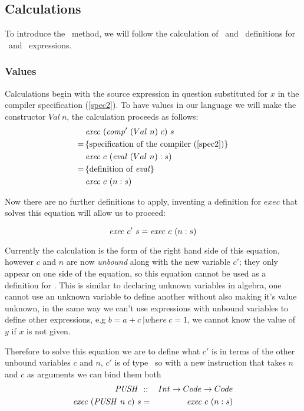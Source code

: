 \documentclass {article}
\begin{document}
\subsection{Calculations}

To introduce the \BH\ method,
we will follow the 
calculation of \comp\ and \exec\ definitions
for \val\ and \add\ expressions\cite[\S2.5]{bandh}.

\subsubsection{Values}

Calculations begin with the source expression in question 
substituted for $x$ in the compiler specification (\ref{spec2}).
To have values in our language we will make the constructor
$Val\ n$, 
the calculation proceeds as follows\cite{bandh}:
\begin{align*}
&\mathit{exec\ } (\mathit{comp'\ } (Val\ n)\ c)\ s \\
=\, & \{ \mbox{specification of the compiler (\ref{spec2})} \} \\
&\mathit{exec\ } c\ (\mathit{eval\ } (Val\ n) : s) \\
=\, & \{ \mbox{definition of \textit{eval}} \} \\
&\mathit{exec\ } c\ (n:s)
\end{align*}

Now there are no further definitions to apply,
inventing a definition for $exec$ that solves this equation
will allow us to proceed:

\[ \mathit{exec\ }  c'\ s = \mathit{exec\ }  c\ (n : s) \]

Currently the calculation is the form of
the right hand side of this equation,
however $c$ and $n$ are now \emph{unbound}
along with the new variable $c'$;
they only appear on one side of the equation,
so this equation cannot be used  as a definition
for \exec.
This is similar to declaring unknown variables 
in algebra, one cannot use an unknown variable to define
another without also making it's value unknown,
in the same way we can't use expressions with
unbound variables to define other expressions,
e.g \(b = a + c\ | \textit{where}\ c = 1\), we cannot
know the value of $y$ if $x$ is not given.

Therefore to solve this equation we are to
define what $c'$ is in terms of 
the other unbound variables $c$ and $n$,
$c'$ is of  type \code\ 
so with a new instruction that takes $n$
and $c$ as arguments we can bind them both\cite[bottom of page 9]{bandh}
\newcommand{\PUSHt}{\textit{PUSH\ }}
\newcommand{\PUSH}{\mathit{PUSH\ }}
\begin{eqnarray}
\PUSH &::& Int \rightarrow Code \rightarrow Code \nonumber \\
\Exec (\PUSH n\ c)\ s &=& \Exec c\ (n :s) \label{execpush}
\end{eqnarray}
\end{document}
